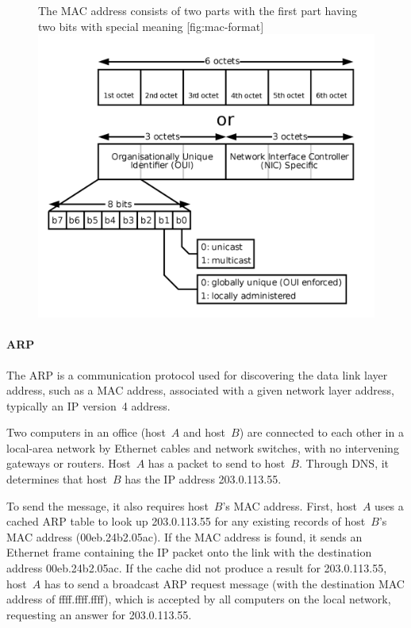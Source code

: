 \begin{figure}
\begin{sidecaption}%
   [The format of a \acs{MAC} address]%
   {The \acs{MAC} address consists of two parts with the first part having two bits with special meaning}%
   [fig:mac-format]
\centering
\includegraphics[width=\textwidth]{images/ethernet/mac-address-format.png}
\end{sidecaption}
\end{figure}


\paragraph{\acf{ARP}}
The \acl{ARP} is a communication protocol used for discovering the data link layer address, such as a \acs{MAC} address, associated with a given network layer address, typically an \acs{IP} version~4 address.

Two computers in an office (host~$A$ and host~$B$) are connected to each other in a local-area network by Ethernet cables and network switches, with no intervening gateways or routers.
Host~$A$ has a packet to send to host~$B$.
Through \acs{DNS}, it determines that host~$B$ has the \acs{IP} address 203.0.113.55.

To send the message, it also requires host~$B$'s \acs{MAC} address.
First, host~$A$ uses a cached \acs{ARP} table to look up 203.0.113.55 for any existing records of host~$B$'s \acs{MAC} address (00eb.\-24b2.\-05ac).
If the \acs{MAC} address is found, it sends an Ethernet frame containing the \acs{IP} packet onto the link with the destination address 00eb.\-24b2.\-05ac.
If the cache did not produce a result for 203.0.113.55, host~$A$ has to send a broadcast \acs{ARP} request message (with the destination \acs{MAC} address of ffff.\-ffff.\-ffff), which is accepted by all computers on the local network, requesting an answer for 203.0.113.55.

